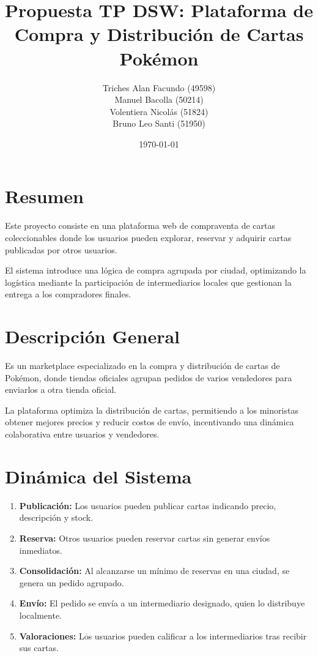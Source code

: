 \documentclass[a4paper,12pt]{article}
\title{Propuesta TP DSW: Plataforma de Compra y Distribución de Cartas Pokémon}
\author{
  Triches Alan Facundo (49598) \\
  Manuel Bacolla (50214) \\
  Volentiera Nicolás (51824) \\
  Bruno Leo Santi (51950)
}
\date{\today}
\begin{document}
\maketitle

\section*{Resumen}
Este proyecto consiste en una plataforma web de compraventa de cartas coleccionables donde los usuarios pueden explorar, reservar y adquirir cartas publicadas por otros usuarios.

El sistema introduce una lógica de compra agrupada por ciudad, optimizando la logística mediante la participación de intermediarios locales que gestionan la entrega a los compradores finales.

\section{Descripción General}
Es un marketplace especializado en la compra y distribución de cartas de Pokémon, donde tiendas oficiales agrupan pedidos de varios vendedores para enviarlos a otra tienda oficial.

La plataforma optimiza la distribución de cartas, permitiendo a los minoristas obtener mejores precios y reducir costos de envío, incentivando una dinámica colaborativa entre usuarios y vendedores.

\section{Dinámica del Sistema}

\begin{enumerate}
  \item \textbf{Publicación:} Los usuarios pueden publicar cartas indicando precio, descripción y stock.
  \item \textbf{Reserva:} Otros usuarios pueden reservar cartas sin generar envíos inmediatos.
  \item \textbf{Consolidación:} Al alcanzarse un mínimo de reservas en una ciudad, se genera un pedido agrupado.
  \item \textbf{Envío:} El pedido se envía a un intermediario designado, quien lo distribuye localmente.
  \item \textbf{Valoraciones:} Los usuarios pueden calificar a los intermediarios tras recibir sus cartas.
\end{enumerate}
\end{document}

